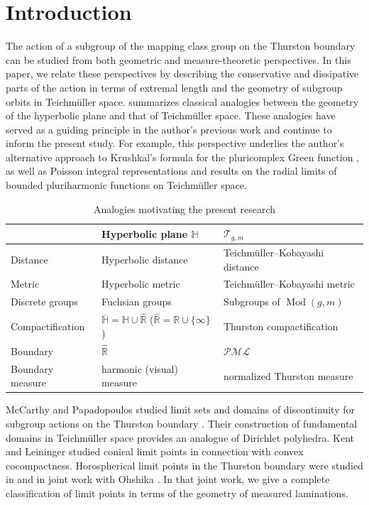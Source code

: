\documentclass[dvipdfmx]{amsart}
\theoremstyle{remark}
\newcommand{\teich}{\mathcal{T}}
\newcommand{\tmod}{\operatorname{Mod}}
\newcommand{\pml}{\mathcal{PML}}
\begin{document}
\section{Introduction}

The action of a subgroup of the mapping class group on the Thurston boundary can be studied from both geometric and measure-theoretic perspectives. In this paper, we relate these perspectives by describing the conservative and dissipative parts of the action in terms of extremal length and the geometry of subgroup orbits in Teichm\"uller space.
 summarizes classical analogies between the geometry of the hyperbolic plane and that of Teichm\"uller space.
These analogies have served as a guiding principle in the author's
previous work and continue to inform the present study.
For example, this perspective underlies the author's alternative approach
to Krushkal's formula for the pluricomplex Green function
\cite{Miyachi2019}, as well as Poisson integral representations
\cite{Miyachi2023,miyachi2025bddpluriharmonicfunctionII-ToAppear}
and results on the radial limits of bounded pluriharmonic functions
\cite{Miyachi2024Bounded} on Teichm\"uller space.
\begin{table}
\centering
\begin{tabular}{|l|l|l|}
\hline
  & Hyperbolic plane $\mathbb{H}$ & $\teich_{g,m}$ \\
\hline\hline
Distance & Hyperbolic distance & Teichm\"uller--Kobayashi distance \\ \hline
Metric & Hyperbolic metric & Teichm\"uller--Kobayashi metric \\ \hline
Discrete groups & Fuchsian groups
& Subgroups of $\tmod(g,m)$ \\ \hline
Compactification & $\overline{\mathbb{H}}=\mathbb{H}\cup \hat{\mathbb{R}}$ ($\hat{\mathbb{R}}=\mathbb{R}\cup\{\infty\}$) & Thurston compactification
\\
\hline
Boundary & $\hat{\mathbb{R}}$ &
$\pml$
\\
\hline
Boundary measure & harmonic (visual) measure & normalized Thurston measure
\\
\hline
\end{tabular}
\caption{Analogies motivating the present research}
\label{table:dictionary}
\end{table}

McCarthy and Papadopoulos studied limit sets and domains of discontinuity
for subgroup actions on the Thurston boundary
\cite{McCarthyPapadopoulos1989}. Their construction of fundamental
domains in Teichm\"uller space \cite{McCarthyPapadopoulos1996} provides
an analogue of Dirichlet polyhedra. Kent and Leininger
\cite{KentLeininger2008} studied conical limit points in connection with
convex cocompactness. Horospherical limit points in the Thurston boundary
were studied in \cite{miyachi2025functiontheorydynamicsergodic}
and in joint work with Ohshika \cite{miyachi2026limitsetsmappingclass}.
In that joint work, we give a complete classification of limit points in terms of the geometry of measured laminations.
\end{document}
